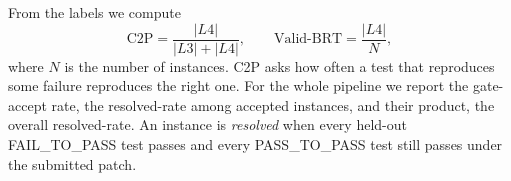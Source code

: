 From the labels we compute
\begin{equation}
  \mathrm{C2P} = \frac{|L4|}{|L3| + |L4|}, \qquad
  \text{Valid-BRT} = \frac{|L4|}{N},
\end{equation}
where $N$ is the number of instances. C2P asks how often a test that
reproduces some failure reproduces the right one. For the whole pipeline we
report the gate-accept rate, the resolved-rate among accepted instances, and
their product, the overall resolved-rate. An instance is \emph{resolved} when
every held-out FAIL\_TO\_PASS test passes and every PASS\_TO\_PASS test still
passes under the submitted patch.
